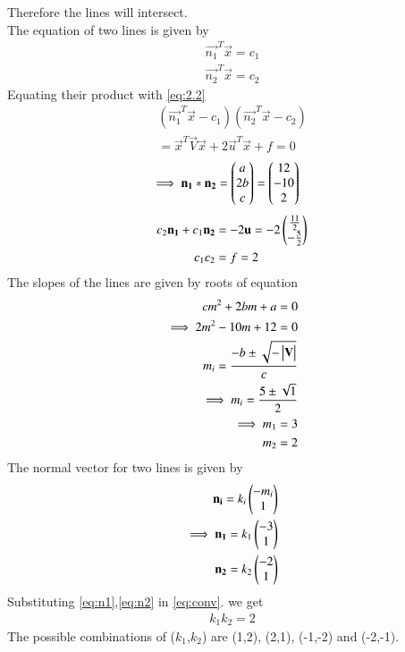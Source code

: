\documentclass[journal,12pt,twocolumn]{IEEEtran}
\begin{document}
\noindent
Therefore the lines will intersect.\\
The equation of two lines is given by
\begin{align}
    \vec{n_1}^T\vec{x}=c_1\label{eq:2.22}\\
    \vec{n_2}^T\vec{x}=c_2\label{eq:2.23}
\end{align}
Equating their product with \eqref{eq:2.2}
\begin{multline}
    (\vec{n_1}^T\vec{x}-c_1)(\vec{n_2}^T\vec{x}-c_2)\\=\vec{x}^T\vec{V}\vec{x}+2\vec{u}^T\vec{x}+f=0
\end{multline}
\begin{align}
    \implies\mathbf{n_1}*\mathbf{n_2}&=\begin{pmatrix}a \\ 2b \\c\end{pmatrix}=\begin{pmatrix}12\\-10\\2\end{pmatrix}\label{eq:conv}
\end{align}
\begin{align}
    c_2\mathbf{n_1}+c_1\mathbf{n_2}&=-2\mathbf{u}=-2\begin{pmatrix}\frac{11}{2} \\ -\frac{5}{2}\end{pmatrix}\label{eq:2.26}\\
    c_1c_2&=f=2
\end{align}
The slopes of the lines are given by roots of equation
\begin{align}
    cm^2+2bm+a=0\label{eq:poly}\\
    \implies 2m^2-10m+12=0\\
    m_i=\frac{-b\pm{\sqrt{-\ensuremath{\begin{vmatrix}\mathbf{V}\end{vmatrix}}}}}{c}\\
    \implies m_i=\frac{5\pm{\sqrt{1}}}{2}\\
    \implies m_1=3\\
     m_2=2
\end{align}
The normal vector for two lines is given by
\begin{align}
    \mathbf{n_i}=k_i\begin{pmatrix}-m_i\\1\end{pmatrix}\label{eq:normvec}\\
    \implies\mathbf{n_1}=k_1\begin{pmatrix}-3\\1\end{pmatrix}\label{eq:n1}\\
    \mathbf{n_2}=k_2\begin{pmatrix}-2\\1\end{pmatrix}\label{eq:n2}
\end{align}
Substituting \eqref{eq:n1},\eqref{eq:n2} in \eqref{eq:conv}. we get
\begin{align}
    k_1k_2=2
\end{align}
The possible combinations of ($k_1$,$k_2$) are (1,2), (2,1), (-1,-2) and (-2,-1).\\
\end{document}
